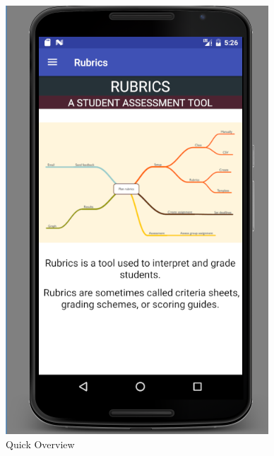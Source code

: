 \begin{figure}[!h]
\begin{minipage}[t]{0.5\linewidth}
    \centering
\hfill\includegraphics[scale=.65]{project/images/welcomepage}\hspace*{\fill}
    \caption{Quick Overview}
    \label{f1}
\end{minipage}
\hspace{0.1cm}
\begin{minipage}[t]{0.5\linewidth} 
    \centering

\end{minipage}
\end{figure}
